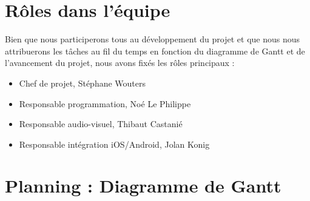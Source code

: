 \documentclass[a4paper,11pt]{article}
\begin{document}
\section{Rôles dans l'équipe}
Bien que nous participerons tous au développement du projet et que nous nous attribuerons les tâches au fil du temps en fonction du diagramme de Gantt et de l'avancement du projet, nous avons fixés les rôles principaux :
\begin{itemize}
\item Chef de projet, Stéphane Wouters
\item Responsable programmation, Noé Le Philippe
\item Responsable audio-visuel, Thibaut Castanié
\item Responsable intégration iOS/Android, Jolan Konig
\end{itemize}

\section{Planning : Diagramme de Gantt}
\newpage

\end{document}
